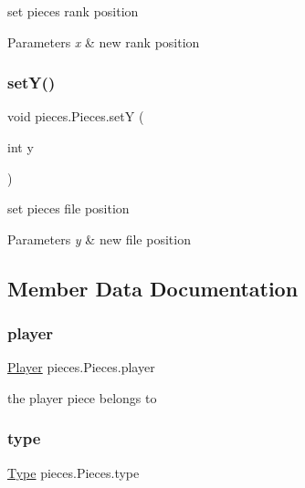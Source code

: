 set piece\textquotesingle{}s rank position 
\begin{DoxyParams}{Parameters}
{\em x} & new rank position \\
\hline
\end{DoxyParams}
\mbox{\label{classpieces_1_1_pieces_aefa2d9a29060faacd79e4e58d2c63196}} 
\subsubsection{\texorpdfstring{set\+Y()}{setY()}}
{\footnotesize\ttfamily void pieces.\+Pieces.\+setY (\begin{DoxyParamCaption}\item[{int}]{y }\end{DoxyParamCaption})\hspace{0.3cm}{\ttfamily [inline]}}

set piece\textquotesingle{}s file position 
\begin{DoxyParams}{Parameters}
{\em y} & new file position \\
\hline
\end{DoxyParams}


\subsection{Member Data Documentation}
\mbox{\label{classpieces_1_1_pieces_a49f35044dd36e5c4b04261a8ea54ad0c}} 
\subsubsection{\texorpdfstring{player}{player}}
{\footnotesize\ttfamily \mbox{\hyperlink{classgame_1_1_player}{Player}} pieces.\+Pieces.\+player}

the player piece belongs to \mbox{\label{classpieces_1_1_pieces_a74572cdf2d798e339c56827050259767}} 
\subsubsection{\texorpdfstring{type}{type}}
{\footnotesize\ttfamily \mbox{\hyperlink{enumpieces_1_1_type}{Type}} pieces.\+Pieces.\+type}

